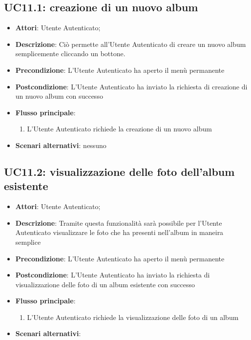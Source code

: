 
\subsection{UC11.1: creazione di un nuovo album}
\label{uc:uc11.1}

\begin{itemize}
  \item \textbf{Attori}: Utente Autenticato;
  \item \textbf{Descrizione}: Ciò permette all'Utente Autenticato di creare un
nuovo album semplicemente cliccando un bottone.
  \item \textbf{Precondizione}: L'Utente Autenticato ha aperto il menù
permanente
  \item \textbf{Postcondizione}: L'Utente Autenticato ha inviato la richiesta
di creazione di un nuovo album con successo
  \item \textbf{Flusso principale}:
  \begin{enumerate}
    \item L'Utente Autenticato richiede la creazione di un nuovo album
  \end{enumerate}
  \item \textbf{Scenari alternativi}: nessuno
\end{itemize}



\subsection{UC11.2: visualizzazione delle foto dell'album esistente}
\label{uc:uc11.2}

\begin{itemize}
  \item \textbf{Attori}: Utente Autenticato;
  \item \textbf{Descrizione}: Tramite questa funzionalità sarà possibile per
l'Utente Autenticato visualizzare le foto che ha presenti nell'album in maneira
semplice
  \item \textbf{Precondizione}: L'Utente Autenticato ha aperto il menù
permanente
  \item \textbf{Postcondizione}: L'Utente Autenticato ha inviato la richiesta
di visualizzazione delle foto di un album esistente con successo
  \item \textbf{Flusso principale}:
  \begin{enumerate}
    \item L'Utente Autenticato richiede la visualizzazione delle foto di un
album
  \end{enumerate}
  \item \textbf{Scenari alternativi}: %
\end{itemize}

